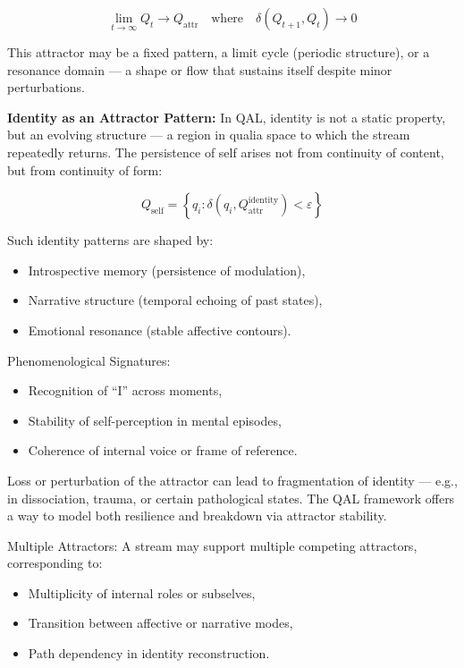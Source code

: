 \documentclass[11pt]{article}
\numberwithin{equation}{section} %
\begin{document}
\begin{equation}
\lim_{t \to \infty} Q_t \rightarrow Q_{\text{attr}} \quad \text{where} \quad \delta(Q_{t+1}, Q_t) \to 0
\end{equation}

This attractor may be a fixed pattern, a limit cycle (periodic structure), or a resonance domain — a shape or flow that sustains itself despite minor perturbations.

\bigskip

\noindent\textbf{Identity as an Attractor Pattern:}  
In QAL, identity is not a static property, but an evolving structure — a region in qualia space to which the stream repeatedly returns. The persistence of self arises not from continuity of content, but from continuity of form:

\begin{equation}
Q_{\text{self}} = \left\{ q_i : \delta(q_i, Q_{\text{attr}}^{\text{identity}}) < \varepsilon \right\}
\end{equation}

Such identity patterns are shaped by:
\begin{itemize}
  \item Introspective memory (persistence of modulation),
  \item Narrative structure (temporal echoing of past states),
  \item Emotional resonance (stable affective contours).
\end{itemize}

\bigskip

\noindent Phenomenological Signatures:
\begin{itemize}
  \item Recognition of “I” across moments,
  \item Stability of self-perception in mental episodes,
  \item Coherence of internal voice or frame of reference.
\end{itemize}

Loss or perturbation of the attractor can lead to fragmentation of identity — e.g., in dissociation, trauma, or certain pathological states. The QAL framework offers a way to model both resilience and breakdown via attractor stability.

\bigskip

\noindent Multiple Attractors:  
A stream may support multiple competing attractors, corresponding to:
\begin{itemize}
  \item Multiplicity of internal roles or subselves,
  \item Transition between affective or narrative modes,
  \item Path dependency in identity reconstruction.
\end{itemize}
\end{document}
